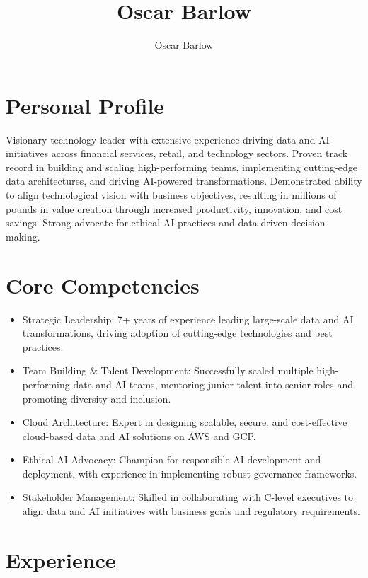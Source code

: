 \documentclass[a4paper]{scrartcl}
\author{Oscar Barlow}
\title{Oscar Barlow}
\date{}
\begin{document}
\maketitle

\section*{Personal Profile}
 { %
  \setlength{\parskip}{6pt plus 2pt minus 1pt}
  Visionary technology leader with extensive experience driving data and AI initiatives across financial services, retail, and technology sectors. Proven track record in building and scaling high-performing teams, implementing cutting-edge data architectures, and driving AI-powered transformations. Demonstrated ability to align technological vision with business objectives, resulting in millions of pounds in value creation through increased productivity, innovation, and cost savings. Strong advocate for ethical AI practices and data-driven decision-making.
 } %

\section*{Core Competencies}
\begin{itemize}
	\item Strategic Leadership: 7+ years of experience leading large-scale data and AI transformations, driving adoption of cutting-edge technologies and best practices.
	\item Team Building & Talent Development: Successfully scaled multiple high-performing data and AI teams, mentoring junior talent into senior roles and promoting diversity and inclusion.
	\item Cloud Architecture: Expert in designing scalable, secure, and cost-effective cloud-based data and AI solutions on AWS and GCP.
	\item Ethical AI Advocacy: Champion for responsible AI development and deployment, with experience in implementing robust governance frameworks.
	\item Stakeholder Management: Skilled in collaborating with C-level executives to align data and AI initiatives with business goals and regulatory requirements.
\end{itemize}

\section*{Experience}
\end{document}
